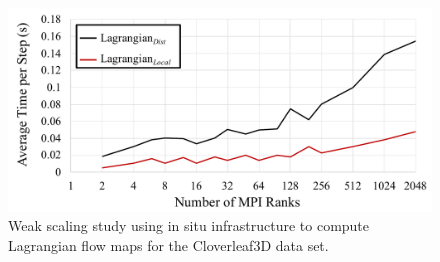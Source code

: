 \begin{figure}[!t]
\centering
\includegraphics[width=0.9\linewidth]{Images/total_time.pdf}
\caption{Weak scaling study using in situ infrastructure to compute Lagrangian flow maps for the Cloverleaf3D data set.}
\label{fig:total_time}
\end{figure}
